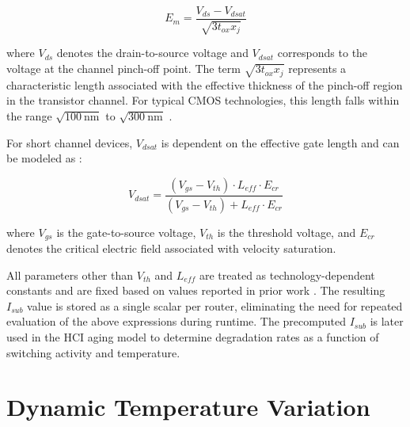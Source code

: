 \begin{equation}
E_m = \frac{V_{ds} - V_{dsat}}{\sqrt{3 t_{ox} x_j}}
\end{equation}

where $V_{ds}$ denotes the drain-to-source voltage and $V_{dsat}$ corresponds to the voltage at the channel pinch-off point. The term $\sqrt{3 t_{ox} x_j}$ represents a characteristic length associated with the effective thickness of the pinch-off region in the transistor channel. For typical CMOS technologies, this length falls within the range $\sqrt{100\ \text{nm}}$ to $\sqrt{300\ \text{nm}}$ \cite{Clotho2015}.

For short channel devices, $V_{dsat}$ is dependent on the effective gate length and can be modeled as \cite{WhiteBernstein2008}:

\begin{equation}
V_{dsat} = \frac{(V_{gs} - V_{th}) \cdot L_{eff} \cdot E_{cr}}{(V_{gs} - V_{th}) + L_{eff} \cdot E_{cr}}
\end{equation}

where $V_{gs}$ is the gate-to-source voltage, $V_{th}$ is the threshold voltage, and $E_{cr}$ denotes the critical electric field associated with velocity saturation.

All parameters other than $V_{th}$ and $L_{eff}$ are treated as technology-dependent constants and are fixed based on values reported in prior work \cite{Clotho2015}. The resulting $I_{sub}$ value is stored as a single scalar per router, eliminating the need for repeated evaluation of the above expressions during runtime. The precomputed $I_{sub}$ is later used in the HCI aging model to determine degradation rates as a function of switching activity and temperature.

\section{Dynamic Temperature Variation}


